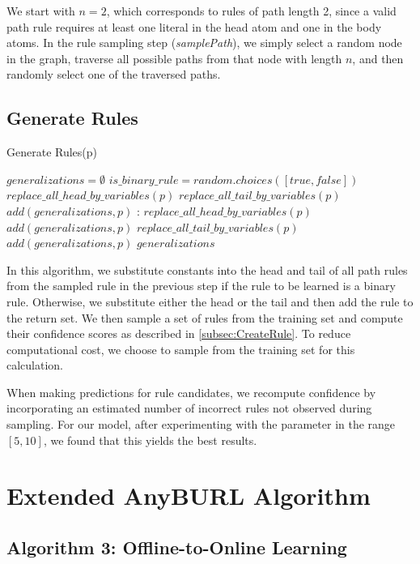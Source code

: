 We start with \(n = 2\), which corresponds to rules of path length 2, since a valid path rule requires at least one literal in the head atom and one in the body atoms. In the rule sampling step (\textit{samplePath}), we simply select a random node in the graph, traverse all possible paths from that node with length \(n\), and then randomly select one of the traversed paths.


\subsection{Generate Rules}
\label{subsec:CreateRule}

\begin{algorithm}[H]
	\caption{Generate Rules(p)}
	\label{alg:GenerateRules}
	\begin{algorithmic}[1]
		\State $\textit{generalizations} = \emptyset$
		\State $is\_binary\_rule = random.choices([true,false])$
		\State $replace\_all\_head\_by\_variables(p)$
		\State $replace\_all\_tail\_by\_variables(p)$
		\State $add(generalizations, p)$
		\Else:
		\State $replace\_all\_head\_by\_variables(p)$
		\State $add(generalizations, p)$
		\State $replace\_all\_tail\_by\_variables(p)$
		\State $add(generalizations, p)$
		\EndIf
		\Return $generalizations$
		\EndProcedure
	\end{algorithmic}
\end{algorithm}

In this algorithm, we substitute constants into the head and tail of all path rules from the sampled rule in the previous step if the rule to be learned is a binary rule. Otherwise, we substitute either the head or the tail and then add the rule to the return set. We then sample a set of rules from the training set and compute their confidence scores as described in \autoref{subsec:CreateRule}. To reduce computational cost, we choose to sample from the training set for this calculation. 

When making predictions for rule candidates, we recompute confidence by incorporating an estimated number of incorrect rules not observed during sampling. For our model, after experimenting with the parameter in the range \([5, 10]\), we found that this yields the best results.

\section{Extended AnyBURL Algorithm}
\subsection{Algorithm 3: Offline-to-Online Learning}


